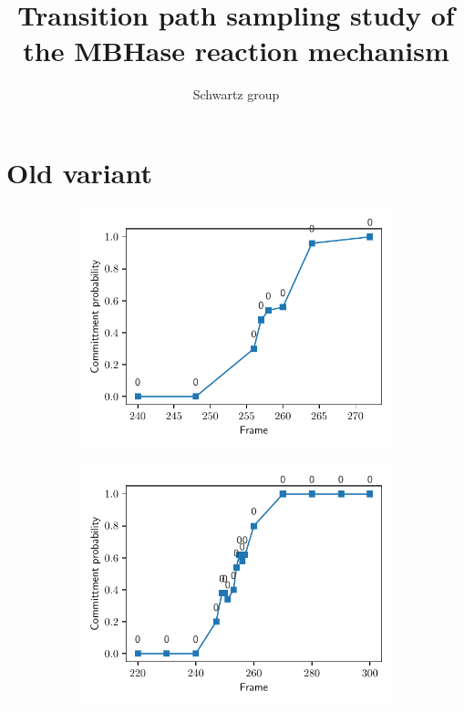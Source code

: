 \documentclass{report}
\title{Transition path sampling study of the MBHase reaction mechanism}
\author{Schwartz group}
\begin{document}
\maketitle

\section{Old variant}
\begin{figure}[ht!]
\begin{subfigure}{.5\textwidth}
  \centering
  \includegraphics[width=.8\linewidth]{figures/dist72.pdf}
  \label{fig:sfig1}
\end{subfigure}%
\begin{subfigure}{.5\textwidth}
  \centering
  \includegraphics[width=.8\linewidth]{figures/dist100.pdf}
  \label{fig:sfig2}
\end{subfigure}
\label{fig:fig}
\end{figure}
\end{document}
